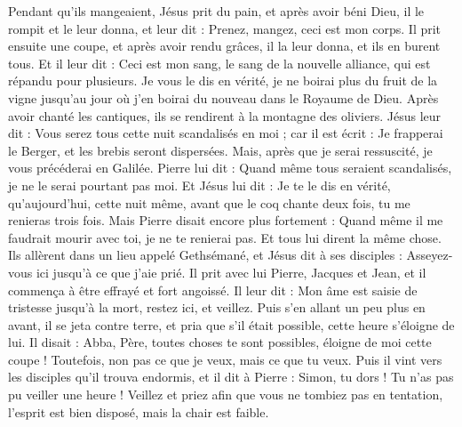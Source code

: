 \begin{multicols}{2}
Pendant qu’ils mangeaient, Jésus prit du pain, et après avoir béni Dieu, il le rompit et le leur donna, et leur dit : Prenez, mangez, ceci est mon corps.
Il prit ensuite une coupe, et après avoir rendu grâces, il la leur donna, et ils en burent tous.
Et il leur dit : Ceci est mon sang{}, le sang de la nouvelle alliance, qui est répandu pour plusieurs.
Je vous le dis en vérité, je ne boirai plus du fruit de la vigne jusqu'au jour où j’en boirai du nouveau dans le Royaume de Dieu.
Après avoir chanté les cantiques{}, ils se rendirent à la montagne des oliviers.
Jésus leur dit : Vous serez tous cette nuit scandalisés en moi ; car il est écrit : Je frapperai le Berger, et les brebis seront dispersées{}.
Mais, après que je serai ressuscité, je vous précéderai en Galilée.
Pierre lui dit : Quand même tous seraient scandalisés, je ne le serai pourtant pas moi.
Et Jésus lui dit : Je te le dis en vérité, qu'aujourd'hui, cette nuit même, avant que le coq chante deux fois, tu me renieras trois fois.
Mais Pierre disait encore plus fortement : Quand même il me faudrait mourir avec toi, je ne te renierai pas. Et tous lui dirent la même chose.
Ils allèrent dans un lieu appelé Gethsémané, et Jésus dit à ses disciples : Asseyez-vous ici jusqu'à ce que j’aie prié.
Il prit avec lui Pierre, Jacques et Jean, et il commença à être effrayé et fort angoissé.
Il leur dit : Mon âme est saisie de tristesse jusqu’à la mort, restez ici, et veillez.
Puis s'en allant un peu plus en avant, il se jeta contre terre, et pria que s'il était possible, cette heure s’éloigne de lui.
Il disait : Abba, Père, toutes choses te sont possibles, éloigne de moi cette coupe ! Toutefois, non pas ce que je veux, mais ce que tu veux.
Puis il vint vers les disciples qu’il trouva endormis, et il dit à Pierre : Simon, tu dors ! Tu n’as pas pu veiller une heure !
Veillez et priez afin que vous ne tombiez pas en tentation, l'esprit est bien disposé, mais la chair est faible.

\end{multicols}
